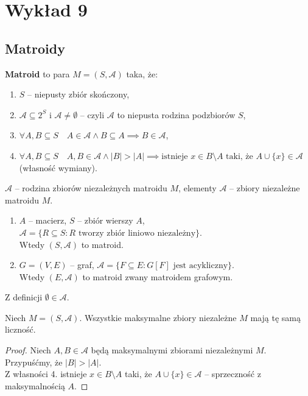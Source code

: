 \section{Wykład 9}
\subsection{Matroidy}

\begin{definition}
	\textbf{Matroid} to para $M = (S, \mathcal{A})$ taka, że:
	\begin{enumerate}
		\item $S$ -- niepusty zbiór skończony,
		\item $\mathcal{A} \subseteq 2^S$ i $\mathcal{A} \neq \emptyset$ -- czyli $\mathcal{A}$ to niepusta rodzina podzbiorów $S$,
		\item $\forall A, B \subseteq S \quad A \in \mathcal{A} \wedge B \subseteq A \implies B \in \mathcal{A}$,
		\item $\forall A, B \subseteq S \quad A, B \in \mathcal{A} \wedge |B| > |A| \implies \text{istnieje } x \in B \setminus A \text{ taki, że } A \cup \{x\} \in \mathcal{A}$ (własność wymiany).
	\end{enumerate}
	$\mathcal{A}$ -- rodzina zbiorów niezależnych matroidu $M$, elementy $\mathcal{A}$ -- zbiory niezależne matroidu $M$.
\end{definition}

\begin{example} \leavevmode
	\begin{enumerate}
		\item $A$ -- macierz, $S$ -- zbiór wierszy $A$, $\mathcal{A} = \{R \subseteq S : R \text{ tworzy zbiór liniowo niezależny}\}$.\\
		Wtedy $(S, \mathcal{A})$ to matroid.
		\item $G = (V, E)$ -- graf, $\mathcal{A} = \{F \subseteq E : G[F] \text{ jest acykliczny}\}$.\\
		Wtedy $(E, \mathcal{A})$ to matroid zwany matroidem grafowym.
	\end{enumerate}
	Z definicji $\emptyset \in \mathcal{A}$.
\end{example}

\begin{lemma}
	Niech $M = (S, \mathcal{A})$. Wszystkie maksymalne zbiory niezależne $M$ mają tę samą liczność.
\end{lemma}
\begin{proof}
	Niech $A, B \in \mathcal{A}$ będą maksymalnymi zbiorami niezależnymi $M$. Przypuśćmy, że $|B| > |A|$.\\
	Z własności 4. istnieje $x \in B \setminus A$ taki, że $A \cup \{x\} \in \mathcal{A}$ -- sprzeczność z maksymalnością $A$.
\end{proof}


